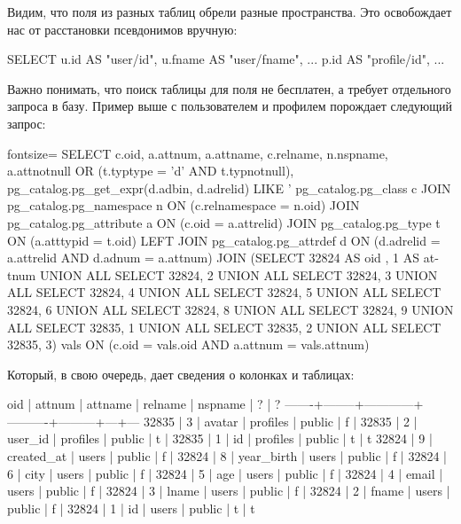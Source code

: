 Видим, что поля из разных таблиц обрели разные пространства. Это освобождает нас от расстановки псевдонимов вручную:

\begin{english}
  \begin{sql}
SELECT
  u.id     AS "user/id",
  u.fname  AS "user/fname",
  ...
  p.id     AS "profile/id",
  ...
  \end{sql}
\end{english}

Важно понимать, что поиск таблицы для поля не бесплатен, а требует отдельного запроса в базу. Пример выше с пользователем и профилем порождает следующий запрос:

\begin{english}
  \begin{sql*}{fontsize=\small}
SELECT c.oid, a.attnum, a.attname, c.relname, n.nspname,
a.attnotnull OR (t.typtype = 'd' AND t.typnotnull),
pg_catalog.pg_get_expr(d.adbin, d.adrelid) LIKE '%
pg_catalog.pg_class c JOIN pg_catalog.pg_namespace n
ON (c.relnamespace = n.oid) JOIN pg_catalog.pg_attribute a
ON (c.oid = a.attrelid) JOIN pg_catalog.pg_type t ON (a.atttypid
= t.oid) LEFT JOIN pg_catalog.pg_attrdef d ON (d.adrelid =
a.attrelid AND d.adnum = a.attnum) JOIN (SELECT 32824 AS oid , 1
AS attnum UNION ALL SELECT 32824, 2 UNION ALL SELECT 32824, 3
UNION ALL SELECT 32824, 4 UNION ALL SELECT 32824, 5 UNION ALL
SELECT 32824, 6 UNION ALL SELECT 32824, 8 UNION ALL SELECT 32824,
9 UNION ALL SELECT 32835, 1 UNION ALL SELECT 32835, 2 UNION ALL
SELECT 32835, 3) vals ON (c.oid = vals.oid AND a.attnum =
vals.attnum)
  \end{sql*}
\end{english}

Который, в свою очередь, дает сведения о колонках и таблицах:

\begin{english}
  \begin{text}
  oid  | attnum |  attname   | relname  | nspname | ? | ?
-------+--------+------------+----------+---------+---+---
 32835 |      3 | avatar     | profiles | public  | f |
 32835 |      2 | user_id    | profiles | public  | t |
 32835 |      1 | id         | profiles | public  | t | t
 32824 |      9 | created_at | users    | public  | f |
 32824 |      8 | year_birth | users    | public  | f |
 32824 |      6 | city       | users    | public  | f |
 32824 |      5 | age        | users    | public  | f |
 32824 |      4 | email      | users    | public  | f |
 32824 |      3 | lname      | users    | public  | f |
 32824 |      2 | fname      | users    | public  | f |
 32824 |      1 | id         | users    | public  | t | t
  \end{text}
\end{english}


